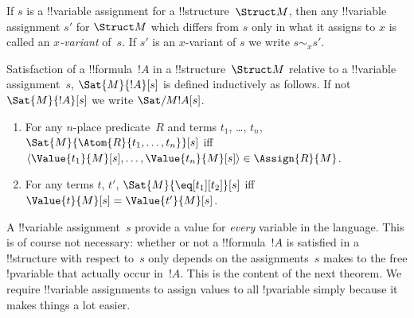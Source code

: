 \documentclass[../../include/open-logic-section]{subfiles}
\begin{document}
\begin{defn}[$x$-Variant]
If $s$ is a !!{variable} assignment for a !!{structure}~$\Struct M$, then any
!!{variable} assignment $s'$ for $\Struct M$ which differs from $s$ only
in what it assigns to $x$ is called an \emph{$x$-variant} of~$s$.  If
$s'$ is an $x$-variant of $s$ we write $s \sim_x s'$.
\end{defn}

\begin{defn}[Satisfaction]
Satisfaction of a !!{formula}~$!A$ in a !!{structure}~$\Struct M$ relative to
a !!{variable} assignment~$s$, $\Sat{M}{!A}[s]$ is defined inductively as
follows. If not $\Sat{M}{!A}[s]$ we write $\Sat/{M}{!A}[s]$.
\begin{enumerate}
\item For any $n$-place predicate~$R$ and terms $t_1$, \dots, $t_n$,
  $\Sat{M}{\Atom{R}{t_1, \dots, t_n}}[s]$ iff $\langle \Value{t_1}{M}[s],
  \dots, \Value{t_n}{M}[s] \rangle \in \Assign{R}{M}$.
\item For any terms $t$, $t'$, $\Sat{M}{\eq[t_1][t_2]}[s]$ iff
  $\Value{t}{M}[s] = \Value{t'}{M}[s]$.
\end{enumerate}
\end{defn}

\begin{explain}
A !!{variable} assignment~$s$ provide a value for \emph{every} variable in
the language. This is of course not necessary: whether or not a
!!{formula}~$!A$ is satisfied in a !!{structure} with respect to~$s$ only
depends on the assignments~$s$ makes to the free !p{variable} that
actually occur in~$!A$.  This is the content of the next theorem.  We
require !!{variable} assignments to assign values to all !p{variable} simply
because it makes things a lot easier.
\end{explain}
\end{document}
